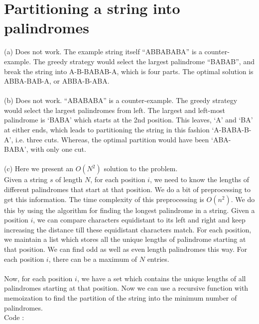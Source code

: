 \documentclass{article}
\begin{document}
\section{Partitioning a string into palindromes}
(a) Does not work. The example string itself “ABBABABA” is a 
counter-example. The greedy strategy would select the largest 
palindrome “BABAB”, and break the string into A-B-BABAB-A, 
which is four parts. The optimal solution is ABBA-BAB-A, or ABBA-B-ABA.\\
\\
(b) Does not work. “ABABABA” is a counter-example. The greedy strategy 
would select the largest palindromes from left. The largest and left-most
palindrome is `BABA' which starts at the 2nd position. This leaves, `A' and
`BA' at either ends, which leads to partitioning the string in this fashion
`A-BABA-B-A', i.e. three cuts. Whereas, the optimal partition would have
been `ABA-BABA', with only one cut.\\
\\
(c) Here we present an $O(N^2)$ solution to the problem.
\\
Given a string $s$ of length $N$, for each position $i$, we need to know the lengths of different palindromes that start at that position. We do a bit of preprocessing to get this information. The time complexity of this preprocessing is $O(n^2)$. We do this by using the algorithm for finding the longest palindrome in a string. Given a position $i$, we can compare characters equidistant to its left and right and keep increasing the distance till these equidistant characters match. For each position, we maintain a list which stores all the unique lengths of palindrome starting at that position. We can find odd as well as even length palindromes this way. For each position $i$, there can be a maximum of $N$ entries. \\
\\
Now, for each position $i$, we have a set which contains the unique lengths of all palindromes starting at that position. Now we can use a recursive function with memoization to find the partition of the string into the minimum number of palindromes. 
\\
Code : 
\end{document}
